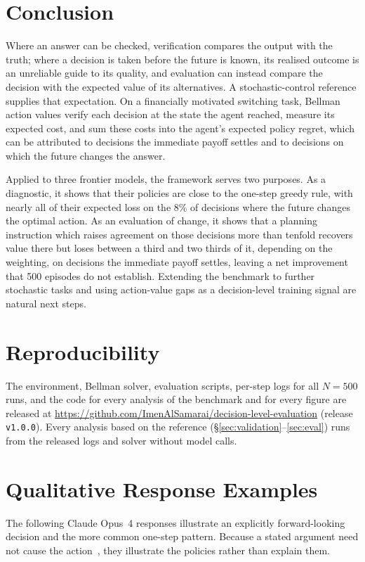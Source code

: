 \documentclass[10pt,a4paper,twocolumn]{article}
\begin{document}
\section{Conclusion}
Where an answer can be checked, verification compares the output with the truth; where a decision is taken before the future is known, its realised outcome is an unreliable guide to its quality, and evaluation can instead compare the decision with the expected value of its alternatives. A stochastic-control reference supplies that expectation. On a financially motivated switching task, Bellman action values verify each decision at the state the agent reached, measure its expected cost, and sum these costs into the agent's expected policy regret, which can be attributed to decisions the immediate payoff settles and to decisions on which the future changes the answer.

Applied to three frontier models, the framework serves two purposes. As a diagnostic, it shows that their policies are close to the one-step greedy rule, with nearly all of their expected loss on the 8\% of decisions where the future changes the optimal action. As an evaluation of change, it shows that a planning instruction which raises agreement on those decisions more than tenfold recovers value there but loses between a third and two thirds of it, depending on the weighting, on decisions the immediate payoff settles, leaving a net improvement that 500 episodes do not establish. Extending the benchmark to further stochastic tasks and using action-value gaps as a decision-level training signal are natural next steps.

\section*{Reproducibility}
The environment, Bellman solver, evaluation scripts, per-step logs for all $N{=}500$ runs, and the code for every analysis of the benchmark and for every figure are released at \url{https://github.com/ImenAlSamarai/decision-level-evaluation} (release \texttt{v1.0.0}). Every analysis based on the reference (\S\ref{sec:validation}--\ref{sec:eval}) runs from the released logs and solver without model calls.

\appendix
\section{Qualitative Response Examples}\label{app:cot}
The following Claude Opus~4 responses illustrate an explicitly forward-looking decision and the more common one-step pattern. Because a stated argument need not cause the action~\cite{turpin2023}, they illustrate the policies rather than explain them.
\end{document}
